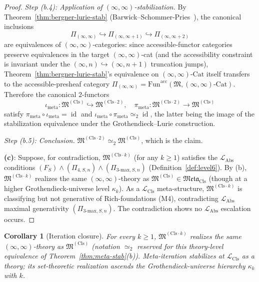 \documentclass[11pt]{article}
\theoremstyle{plain}
\newtheorem{corollary}[theorem]{Corollary}
\theoremstyle{definition}
\newcommand{\fM}{\mathfrak{M}}
\newcommand{\Meta}{\mathfrak{Meta}}
\newcommand{\LCls}{\mathcal{L}_{\mathrm{Cls}}}
\newcommand{\LAbs}{\mathcal{L}_{\mathrm{Abs}}}
\newcommand{\Fun}{\mathrm{Fun}}
\newcommand{\Cat}{\mathrm{Cat}}
\DeclareMathOperator{\id}{id}
\begin{document}
\begin{proof}
\emph{Step (b.4): Application of $(\infty, \infty)$-stabilization.} By Theorem~\ref{thm:bergner-lurie-stab} (Barwick--Schommer-Pries~\cite{BarwickSchommerPries2021}), the canonical inclusions
\[ \Pi_{(\infty, \infty)} \hookrightarrow \Pi_{(\infty, \infty + 1)} \hookrightarrow \Pi_{(\infty, \infty + 2)} \]
are equivalences of $(\infty, \infty)$-categories: since accessible-functor categories preserve equivalences in the target $(\infty, \infty)$-cat (and the accessibility constraint is invariant under the $(\infty, n) \hookrightarrow (\infty, n+1)$ truncation jumps), Theorem~\ref{thm:bergner-lurie-stab}'s equivalence on $(\infty, \infty)$-$\Cat$ itself transfers to the accessible-presheaf category $\Pi_{(\infty, \infty)} = \Fun^{\mathrm{acc}}(\fM, (\infty, \infty)\text{-}\Cat)$. Therefore the canonical $2$-functors
\[ \iota_{\mathrm{meta}} : \fM^{(\mathrm{Cls})} \hookrightarrow \fM^{(\mathrm{Cls}\cdot 2)}, \quad \pi_{\mathrm{meta}} : \fM^{(\mathrm{Cls}\cdot 2)} \to \fM^{(\mathrm{Cls})} \]
satisfy $\pi_{\mathrm{meta}} \circ \iota_{\mathrm{meta}} = \id$ and $\iota_{\mathrm{meta}} \circ \pi_{\mathrm{meta}} \simeq_2 \id$, the latter being the image of the stabilization equivalence under the Grothendieck--Lurie construction.

\emph{Step (b.5): Conclusion.} $\fM^{(\mathrm{Cls}\cdot 2)} \simeq_2 \fM^{(\mathrm{Cls})}$, which is the claim.

\textbf{(c)}: Suppose, for contradiction, $\fM^{(\mathrm{Cls}\cdot k)}$ (for any $k \geq 1$) satisfies the $\LAbs$ conditions $(F_S) \wedge (\Pi_{4, S, n}) \wedge (\Pi_{3\text{-max}, S, n})$ (Definition~\ref{def:level6}). By (b), $\fM^{(\mathrm{Cls}\cdot k)}$ realizes the same $(\infty, \infty)$-theory as $\fM^{(\mathrm{Cls})} \in \Meta_{\mathrm{Cls}}$ (though at a higher Grothendieck-universe level $\kappa_k$). As a $\LCls$ meta-structure, $\fM^{(\mathrm{Cls}\cdot k)}$ is classifying but not generative of Rich-foundations (M4), contradicting $\LAbs$ maximal generativity $(\Pi_{3\text{-max}, S, n})$. The contradiction shows no $\LAbs$ escalation occurs.
\end{proof}

\begin{corollary}[Iteration closure]\label{cor:iteration-closure}
For every $k \geq 1$, $\fM^{(\mathrm{Cls}\cdot k)}$ realizes the same $(\infty, \infty)$-theory as $\fM^{(\mathrm{Cls})}$ (notation $\simeq_2$ reserved for this theory-level equivalence of Theorem~\ref{thm:meta-stab}(b)). Meta-iteration stabilizes at $\LCls$ \emph{as a theory}; its set-theoretic realization ascends the Grothendieck-universe hierarchy $\kappa_k$ with $k$.
\end{corollary}
\end{document}
